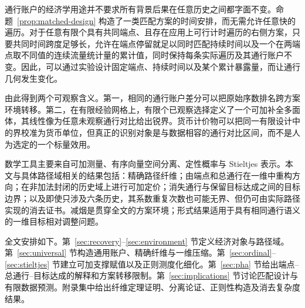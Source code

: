 通行账户的经济学用途并不要求所有背景后果在任意历史之间都字面不变。命题~\ref{prop:matched-design} 构造了一类匹配方案的时间安排，而无需允许任意快的遍历。对于任意有限个具有共同端点、且存在应用上可行计时遍历的右侧方案，只要共同时间跨度足够长，允许在端点停留就足以同时匹配持续时间以及一个在两端点取不同值的连续流量统计量的累计值，同时保持每条实际遍历及其通行账户不变。因此，可以通过实验设计固定端点、持续时间以及某个累计暴露量，而让通行几何发生变化。

由此得到两个可观察含义。第一，相同的通行账户差分可以把原始序数排名跨方案环境转移。第二，在有限经验网格上，有限个已观察选择定义了一个可加补全多面体，其线性像为任意未观察通行对比给出锐界。货币计价物可以把同一有限设计中的界校准为货币单位，但真正的识别对象是与数据相容的通行对比区间，而不是人为选定的一个标量效用。

数学工具主要来自可加测量、有序向量空间分离、定性概率与 Stieltjes 表示。本文与具体路径域相关的结果包括：精确路径纤维；由端点和总通行在一维中重构方向；在非加法封闭的历史域上进行可加定价；消失通行与保留目标达成之间的目标边界；以及即使只涉及六条历史，其系数重复次数也可能无界、但仍可由实际路径实现的消去证书。减烟是贯穿全文的方案环境；形式结果适用于具有相同通行语义的一维目标相对调整问题。

全文安排如下。第~\ref{sec:recovery}--\ref{sec:environment} 节定义经济对象与路径域。第~\ref{sec:universal} 节构造通用账户、精确纤维与一维压缩。第~\ref{sec:ordinal}--\ref{sec:stieltjes} 节建立可加支撑赋值以及正则测度化细化。第~\ref{sec:pha} 节给出端点--总通行--目标达成的解释和方案转移限制。第~\ref{sec:implications} 节讨论匹配设计与有限数据预测。附录集中给出纤维定理证明、分离论证、正则性构造及消去复杂度结果。
